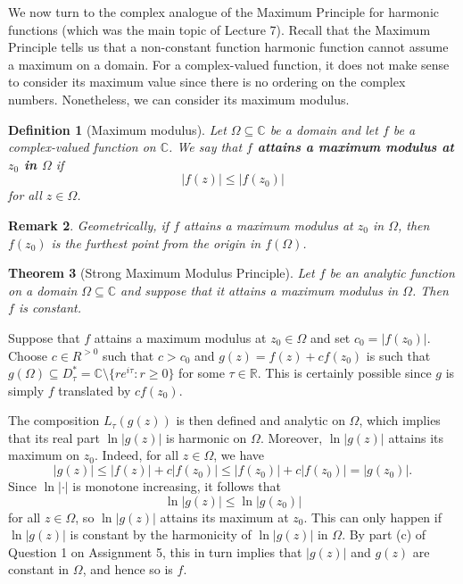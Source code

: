 \documentclass[10pt]{article}
\makeatletter
\newcommand{\R}{\mathbb{R}}
\newcommand{\C}{\mathbb{C}}
\theoremstyle{newstyle}
\newtheorem{thm}{Theorem}[section]
\newtheorem{remark}[thm]{Remark}
\newtheorem{defn}[thm]{Definition}
\newenvironment{pf}[1][\proofname]{\par
  \pushQED{\qed}%
  \normalfont \topsep0\p@\relax
  \trivlist
  \item[\hskip\labelsep\scshape
  #1\@addpunct{.}]\ignorespaces
}{%
  \popQED\endtrivlist\@endpefalse
}
\makeatother
\begin{document}
We now turn to the complex analogue of the Maximum Principle for harmonic functions (which 
was the main topic of Lecture 7). Recall that the Maximum Principle tells us that 
a non-constant function harmonic function cannot assume a maximum on a domain. 
For a complex-valued function, it does not make sense to consider its maximum value 
since there is no ordering on the complex numbers. Nonetheless, we can consider its 
maximum modulus. 

\begin{defn}[Maximum modulus]
Let $\Omega \subseteq \C$ be a domain and let $f$ be a complex-valued function on $\C$. 
We say that {\bf $f$ attains a maximum modulus at $z_0$ in $\Omega$} if 
\[ |f(z)| \leq |f(z_0)| \]
for all $z \in \Omega$. 
\end{defn}

\begin{remark}
Geometrically, if $f$ attains a maximum modulus at $z_0$ in $\Omega$, then 
$f(z_0)$ is the furthest point from the origin in $f(\Omega)$.
\end{remark}

\begin{thm}[Strong Maximum Modulus Principle]
Let $f$ be an analytic function on a domain $\Omega \subseteq \C$ and suppose that 
it attains a maximum modulus in $\Omega$. Then $f$ is constant.
\end{thm}
\begin{pf}
Suppose that $f$ attains a maximum modulus at $z_0 \in \Omega$ and set $c_0 = |f(z_0)|$. 
Choose $c \in R^{>0}$ such that $c > c_0$ and $g(z) 
= f(z) + cf(z_0)$ is such that $g(\Omega) \subseteq D^*_\tau = \C \setminus \{re^{i\tau} : r \geq 0\}$
for some $\tau \in \R$. This is certainly possible since $g$ is simply $f$ translated by 
$cf(z_0)$. 

The composition $L_\tau(g(z))$ is then defined and analytic on $\Omega$, which implies that its 
real part $\ln|g(z)|$ is harmonic on $\Omega$. Moreover, $\ln|g(z)|$ attains its maximum on 
$z_0$. Indeed, for all $z \in \Omega$, we have 
\[ |g(z)| \leq |f(z)| + c|f(z_0)| \leq |f(z_0)| + c|f(z_0)| = |g(z_0)|. \]
Since $\ln|\cdot|$ is monotone increasing, it follows that 
\[ \ln|g(z)| \leq \ln|g(z_0)| \]
for all $z \in \Omega$, so $\ln|g(z)|$ attains its maximum at $z_0$. This can only happen if 
$\ln|g(z)|$ is constant by the harmonicity of $\ln|g(z)|$ in $\Omega$. 
By part (c) of Question 1 on Assignment 5, this in turn implies that $|g(z)|$ and $g(z)$ are 
constant in $\Omega$, and hence so is $f$. 
\end{pf}
\end{document}
